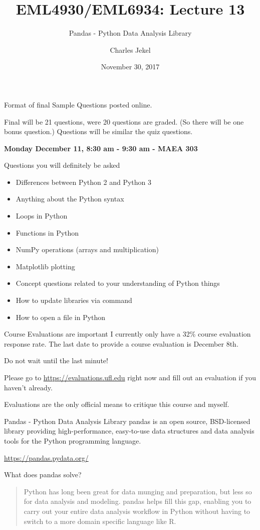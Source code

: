 \documentclass[10pt]{beamer}
\title{EML4930/EML6934: Lecture 13}
\subtitle{Pandas - Python Data Analysis Library}
\date{November 30, 2017}
\author{Charles Jekel}
\begin{document}
\maketitle

\begin{frame}{Format of final}
Sample Questions posted online.

Final will be 21 questions, were 20 questions are graded. (So there will be one bonus question.) Questions will be similar the quiz questions.

\textbf{Monday December 11, 8:30 am - 9:30 am - MAEA 303}
\end{frame}

\begin{frame}{Questions you will definitely be asked}
\begin{itemize}
\item Differences between Python 2 and Python 3
\item Anything about the Python syntax
\item Loops in Python
\item Functions in Python
\item NumPy operations (arrays and multiplication) 
\item Matplotlib plotting
\item Concept questions related to your understanding of Python things
\item How to update libraries via command
\item How to open a file in Python
\end{itemize}
\end{frame}

\begin{frame}{Course Evaluations are important}
I currently only have a 32\% course evaluation response rate. The last date to provide a course evaluation is December 8th. 

Do not wait until the last minute!

Please go to \url{https://evaluations.ufl.edu} right now and fill out an evaluation if you haven't already.  

Evaluations are the only official means to critique this course and myself.
\end{frame}

\begin{frame}{Pandas - Python Data Analysis Library}
pandas is an open source, BSD-licensed library providing high-performance, easy-to-use data structures and data analysis tools for the Python programming language.

\url{https://pandas.pydata.org/}

What does pandas solve?
  \begin{quote}
    Python has long been great for data munging and preparation, but less so for data analysis and modeling. pandas helps fill this gap, enabling you to carry out your entire data analysis workflow in Python without having to switch to a more domain specific language like R.
\end{quote}

\end{frame}
\end{document}

